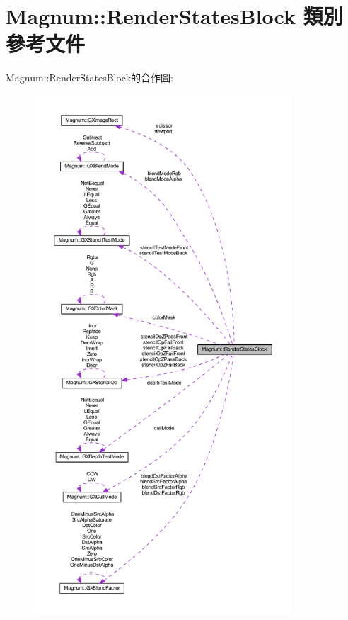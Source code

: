 \hypertarget{class_magnum_1_1_render_states_block}{}\section{Magnum\+:\+:Render\+States\+Block 類別 參考文件}
\label{class_magnum_1_1_render_states_block}


Magnum\+:\+:Render\+States\+Block的合作圖\+:\nopagebreak
\begin{figure}[H]
\begin{center}
\leavevmode
\includegraphics[height=550pt]{class_magnum_1_1_render_states_block__coll__graph}
\end{center}
\end{figure}

